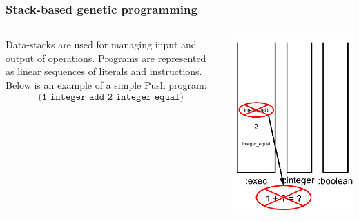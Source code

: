 \documentclass{beamer}
\newcommand{\linespace}{\vskip 0.25cm}
\begin{document}
\begin{frame}
	\frametitle{Stack-based genetic programming}
	\begin{columns}
		\begin{column}{0.65\textwidth}
			Data-stacks are used for managing input and output of operations.
			\linespace
			\linespace
			\linespace
			Programs are represented as linear sequences of literals and instructions. Below is an example of a simple Push program:
			\[\texttt{(1 integer\_add 2 integer\_equal)}\]
		\end{column}
		\begin{column}{0.35\textwidth}
			\includegraphics[height=.7\textheight]{Illustrations/stack_3_7.PDF}
		\end{column}
	\end{columns}
\end{frame}
\end{document}

